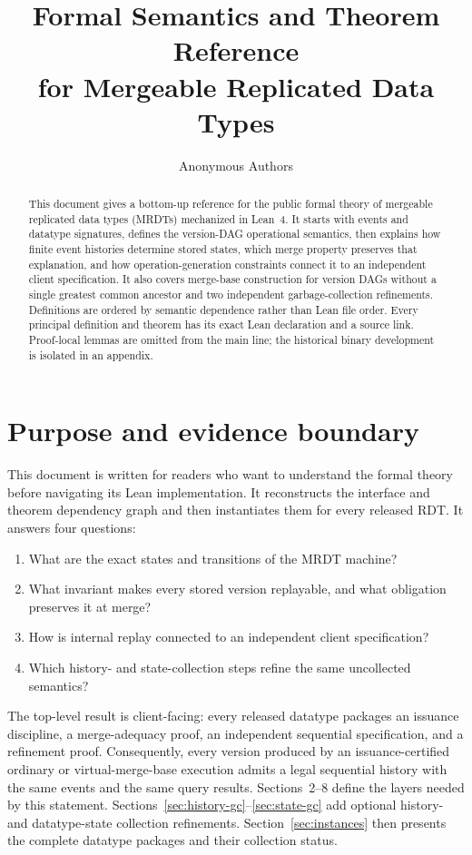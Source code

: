 \documentclass[11pt]{article}
\title{Formal Semantics and Theorem Reference\\
  for Mergeable Replicated Data Types}
\author{Anonymous Authors}
\date{}
\theoremstyle{definition}
\begin{document}
\maketitle

\begin{abstract}
This document gives a bottom-up reference for the public formal theory of
mergeable replicated data types (MRDTs) mechanized in Lean~4. It starts with
events and datatype signatures, defines the version-DAG operational semantics,
then explains how finite event histories determine stored states, which merge
property preserves that explanation, and how operation-generation constraints
connect it to an independent client specification. It also covers merge-base
construction for version DAGs without a single greatest common ancestor and
two independent garbage-collection refinements. Definitions are ordered by
semantic dependence rather than Lean file order. Every principal definition
and theorem has its exact Lean declaration and a source link. Proof-local
lemmas are omitted from the main line; the historical binary development is
isolated in an appendix.
\end{abstract}

\tableofcontents

\section{Purpose and evidence boundary}

This document is written for readers who want to understand the formal theory
before navigating its Lean implementation.  It reconstructs the interface and
theorem dependency graph and then instantiates them for every released RDT. It
answers four questions:
\begin{enumerate}
\item What are the exact states and transitions of the MRDT machine?
\item What invariant makes every stored version replayable, and what
  obligation preserves it at merge?
\item How is internal replay connected to an independent client specification?
\item Which history- and state-collection steps refine the same uncollected
  semantics?
\end{enumerate}

The top-level result is client-facing: every released datatype packages an
issuance discipline, a merge-adequacy proof, an independent sequential
specification, and a refinement proof. Consequently, every version produced
by an issuance-certified ordinary or virtual-merge-base execution admits a
legal sequential history with the same events and the same query results.
Sections~2--8 define the layers needed by this statement.
Sections~\ref{sec:history-gc}--\ref{sec:state-gc} add optional history-
and datatype-state collection refinements. Section~\ref{sec:instances}
then presents the complete datatype packages and their collection status.
\end{document}
